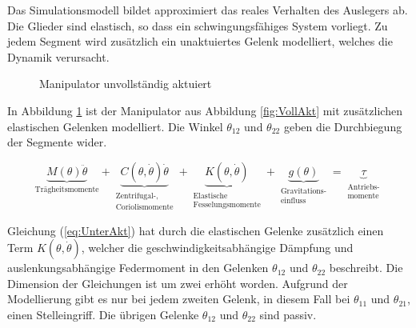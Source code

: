 Das Simulationsmodell bildet approximiert das reales Verhalten des Auslegers ab. Die Glieder sind elastisch, so dass ein schwingungsfähiges System vorliegt. Zu jedem Segment wird zusätzlich ein unaktuiertes Gelenk modelliert, welches die Dynamik verursacht.

\begin{figure}[h]
	\centering
	
	\caption{Manipulator unvollständig aktuiert}
	\label{fig:UnterAkt}
\end{figure}   

In Abbildung \ref{fig:UnterAkt} ist der Manipulator aus Abbildung \ref{fig:VollAkt} mit zusätzlichen elastischen Gelenken modelliert. Die Winkel $\theta_{12}$ und $\theta_{22}$ geben die Durchbiegung der Segmente wider.

\begin{equation} \label{eq:UnterAkt}
\underbrace{M(\theta)\ddot{\theta}}_{\mbox{Trägheitsmomente}} + \underbrace{C(\theta,\dot{\theta})\dot{\theta}}_{\begin{matrix}
\mbox{Zentrifugal-,} \\ \mbox{Coriolismomente} \end{matrix}}+\underbrace{K(\theta,\dot{\theta})}_{\begin{matrix}
\mbox{Elastische} \\ \mbox{Fesselungsmomente} \end{matrix}}+\underbrace{g(\theta)}_{\begin{matrix}
\mbox{Gravitations-} \\ \mbox{einfluss} \end{matrix}}=\underbrace{\tau}_{\begin{matrix}
\mbox{Antriebs-} \\ \mbox{momente} \end{matrix}} 
\end{equation} 

Gleichung (\ref{eq:UnterAkt}) hat durch die elastischen Gelenke zusätzlich einen Term $K(\theta,\dot{\theta})$, welcher die geschwindigkeitsabhängige Dämpfung und auslenkungsabhängige Federmoment in den Gelenken $\theta_{12}$ und $\theta_{22}$ beschreibt. Die Dimension der Gleichungen ist um zwei erhöht worden. %
Aufgrund der Modellierung gibt es nur bei jedem zweiten Gelenk, in diesem Fall bei $\theta_{11}$ und $\theta_{21}$, einen Stelleingriff. Die übrigen Gelenke $\theta_{12}$ und $\theta_{22}$ sind passiv.


